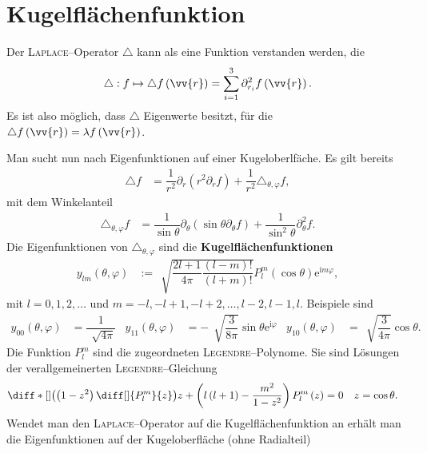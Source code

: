\documentclass[a4paper,12pt]{article}
\numberwithin{equation}{section}
\begin{document}
\section{Kugelflächenfunktion}
Der \textsc{Laplace}--Operator $\triangle$ kann als eine Funktion verstanden werden, die
\begin{align} 
        \triangle :f\mapsto \triangle f\left(\vv{r}\right)=\sum_{i=1}^{3}\partial _{r_i}^2 f\left(\vv{r}\right)
.\end{align} 
Es ist also möglich, dass $\triangle$ Eigenwerte besitzt, für die $\triangle f\left(\vv{r}\right)=\lambda f\left(\vv{r}\right)$.\par
Man sucht nun nach Eigenfunktionen auf einer Kugeloberlfäche. Es gilt bereits
\begin{align} 
        \triangle f&=\dfrac{1}{r^2}\partial_r \left(r^2\partial_r f\right)+\dfrac{1}{r^2}\triangle _{\theta ,\varphi }f
,\end{align} 
mit dem Winkelanteil 
\begin{align} 
        \triangle _{\theta ,\varphi }f&=\dfrac{1}{\sin \theta }\partial _\theta \left(\sin \theta \partial_\theta  f\right)+\dfrac{1}{\sin ^2\theta }\partial_\theta ^2 f
.\end{align} 
Die Eigenfunktionen von $\triangle _{\theta ,\varphi }$ sind die \textbf{Kugelflächenfunktionen}
\begin{align} 
        y_{lm}\left(\theta ,\varphi \right)&:=\,\sqrt[]{\dfrac{2l+1}{4\pi }\dfrac{\left(l-m\right)!}{\left(l+m\right)!}}P_l^m \left(\cos \theta \right)\text{e}^{\text{i}m\varphi }
,\end{align} 
mit $l=0,1,2,\hdots $ und $m=-l,-l+1,-l+2,\hdots ,l-2,l-1,l$. Beispiele sind
\begin{align} 
        y_{00}\left(\theta ,\varphi \right)&=\dfrac{1}{\,\sqrt[]{4\pi }}&y_{11}\left(\theta ,\varphi \right)&=-\,\sqrt[]{\dfrac{3}{8\pi }}\sin \theta \text{e}^{\text{i}\varphi }&y_{10}\left(\theta ,\varphi \right)&=\,\sqrt[]{\dfrac{3}{4\pi }}\cos \theta 
.\end{align}
Die Funktion $P_l^m$ sind die zugeordneten \textsc{Legendre}--Polynome. Sie sind Lösungen der verallgemeinerten \textsc{Legendre}--Gleichung
\begin{align} 
        \diff*[]{\left(\left(1-z^2\right)\diff[]{P_l^m}{z}\right)}{z}+\left(l\left(l+1\right)-\dfrac{m^2}{1-z^2}\right)P_l^m\left(z\right)&=0&z&=\cos \theta 
.\end{align} 
Wendet man den \textsc{Laplace}--Operator auf die Kugelflächenfunktion an erhält man die Eigenfunktionen auf der Kugeloberfläche (ohne Radialteil)
\end{document}
